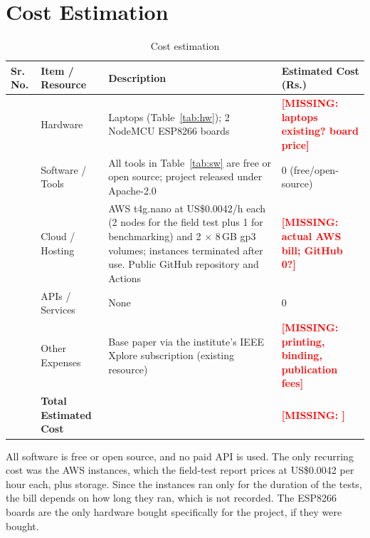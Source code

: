 \documentclass[12pt,a4paper,oneside]{report}
\numberwithin{equation}{chapter}
\newcommand{\MISSING}[1]{\textcolor{red}{\textbf{[MISSING: #1]}}}
\begin{document}
\section{Cost Estimation}
\label{sec:cost}
\begin{table}[H]
\centering
\caption{Cost estimation}
\label{tab:cost}
\small
\begin{tabularx}{\textwidth}{|>{\centering\arraybackslash}p{}|P{0.18\textwidth}|Y|P{0.2\textwidth}|}
\hline
\textbf{Sr. No.} & \textbf{Item / Resource} & \textbf{Description} & \textbf{Estimated Cost (Rs.)}\\  & Hardware & Laptops (Table~\ref{tab:hw}); 2 NodeMCU ESP8266 boards & \MISSING{laptops existing? board price}\\  & Software / Tools & All tools in Table~\ref{tab:sw} are free or open source; project released under Apache-2.0 & 0 (free/open-source)\\  & Cloud / Hosting & AWS t4g.nano at US\$0.0042/h each (2 nodes for the field test plus 1 for benchmarking) and 2 $\times$ 8\,GB gp3 volumes; instances terminated after use. Public GitHub repository and Actions & \MISSING{actual AWS bill; GitHub 0?}\\  & APIs / Services & None & 0\\  & Other Expenses & Base paper via the institute's IEEE Xplore subscription (existing resource) & \MISSING{printing, binding, publication fees}\\ \hline
 & \textbf{Total Estimated Cost} & & \MISSING{}\\ \hline
\end{tabularx}
\end{table}

All software is free or open source, and no paid API is used. The only recurring cost was the AWS instances, which the field-test report prices at US\$0.0042 per hour each, plus storage. Since the instances ran only for the duration of the tests, the bill depends on how long they ran, which is not recorded. The ESP8266 boards are the only hardware bought specifically for the project, if they were bought.
\end{document}
